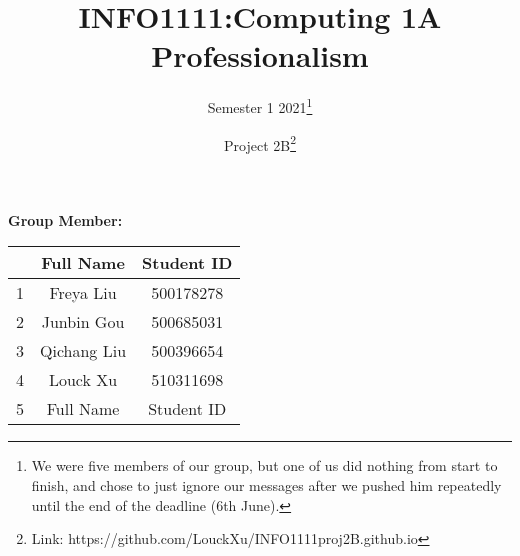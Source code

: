 \documentclass{article}
\title{INFO1111:Computing 1A Professionalism}
\author{Semester 1 2021\thanks{We were five members of our group, but one of us did nothing from start to finish, and chose to just ignore our messages after we pushed him repeatedly until the end of the deadline (6th June).}}
\date{Project 2B\thanks{Link: https://github.com/LouckXu/INFO1111proj2B.github.io}}
\begin{document}
	
	
	\begin{titlepage}
		\maketitle
		\begin{title}
			\begin{center}
				\textbf{Group Member:}
			\end{center}
		\end{title}
		\begin{center}
			
			\begin{tabular}{|c|c|c|}
				\hline &Full Name& Student ID\\
				\hline 1& Freya Liu & 500178278  \\
				\hline 2& Junbin Gou & 500685031  \\
				\hline 3& Qichang Liu & 500396654 \\
				\hline 4& Louck Xu & 510311698  \\
				\hline 5&Full Name& Student ID  \\
				\hline
			\end{tabular}
		\end{center}
	\end{titlepage}
	
\end{document}
